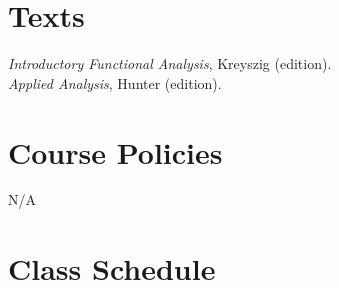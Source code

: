 \documentclass[course=Introduction\ to\ Functional\ Analysis, semester=Fall\ 2021]{syllabustemplate}
\begin{document}
\section{Texts}
\label{sec:texts}
\textit{Introductory Functional Analysis}, Kreyszig (edition).\\

\textit{Applied Analysis}, Hunter (edition).

\section{Course Policies}
\label{sec:course_policies}

N/A

%
%
%
%
%
%

\pagebreak
\section{Class Schedule}
\label{sec:class_schedule}
\end{document}
